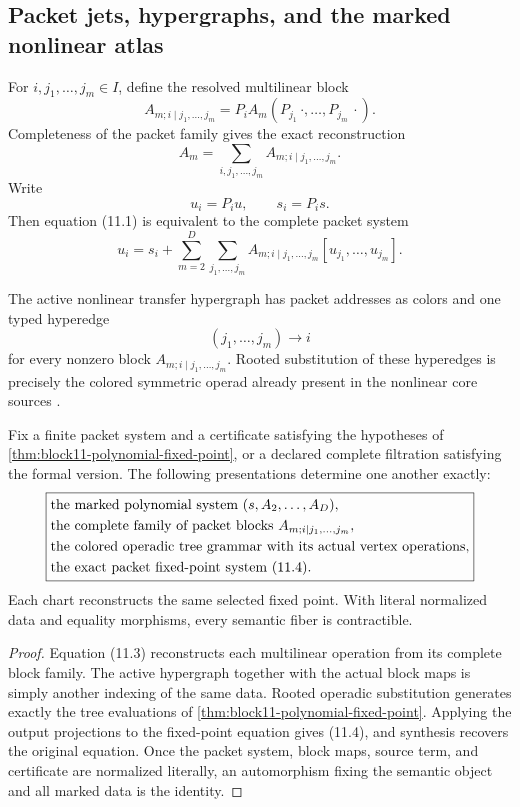 \subsection{Packet jets, hypergraphs, and the marked nonlinear atlas}
\label{subsec:block11-packet-atlas}

For $i,j_1,\ldots,j_m\in I$, define the resolved multilinear block
\[
 A_{m;i\mid j_1,\ldots,j_m}
 =
 P_iA_m(P_{j_1}\,\cdot,\ldots,P_{j_m}\,\cdot).
\]
Completeness of the packet family gives the exact reconstruction
\[
 \boxed{
 A_m
 =
 \sum_{i,j_1,\ldots,j_m}
 A_{m;i\mid j_1,\ldots,j_m}.}
 \tag{11.3}
\]
Write
\[
 u_i=P_iu,
 \qquad
 s_i=P_is.
\]
Then equation \textup{(11.1)} is equivalent to the complete packet system
\[
 \boxed{
 u_i
 =
 s_i+
 \sum_{m=2}^{D}
 \sum_{j_1,\ldots,j_m}
 A_{m;i\mid j_1,\ldots,j_m}
 [u_{j_1},\ldots,u_{j_m}].}
 \tag{11.4}
\]

The active nonlinear transfer hypergraph has packet addresses as colors and one typed hyperedge
\[
 (j_1,\ldots,j_m)\longrightarrow i
\]
for every nonzero block $A_{m;i\mid j_1,\ldots,j_m}$.  Rooted substitution of these hyperedges is precisely the colored symmetric operad already present in the nonlinear core sources \cite{RT,NLO}.

\begin{theorem}
\label{thm:block11-marked-atlas}
Fix a finite packet system and a certificate satisfying the hypotheses of \cref{thm:block11-polynomial-fixed-point}, or a declared complete filtration satisfying the formal version.  The following presentations determine one another exactly:
\[
 \boxed{
 \begin{aligned}
 &\text{the marked polynomial system }(s,A_2,\ldots,A_D),\\
 &\text{the complete family of packet blocks }A_{m;i\mid j_1,\ldots,j_m},\\
 &\text{the colored operadic tree grammar with its actual vertex operations},\\
 &\text{the exact packet fixed-point system \textup{(11.4)}}.
 \end{aligned}}
\]
Each chart reconstructs the same selected fixed point.  With literal normalized data and equality morphisms, every semantic fiber is contractible.
\end{theorem}

\begin{proof}
Equation \textup{(11.3)} reconstructs each multilinear operation from its complete block family.  The active hypergraph together with the actual block maps is simply another indexing of the same data.  Rooted operadic substitution generates exactly the tree evaluations of \cref{thm:block11-polynomial-fixed-point}.  Applying the output projections to the fixed-point equation gives \textup{(11.4)}, and synthesis recovers the original equation.  Once the packet system, block maps, source term, and certificate are normalized literally, an automorphism fixing the semantic object and all marked data is the identity.
\end{proof}

